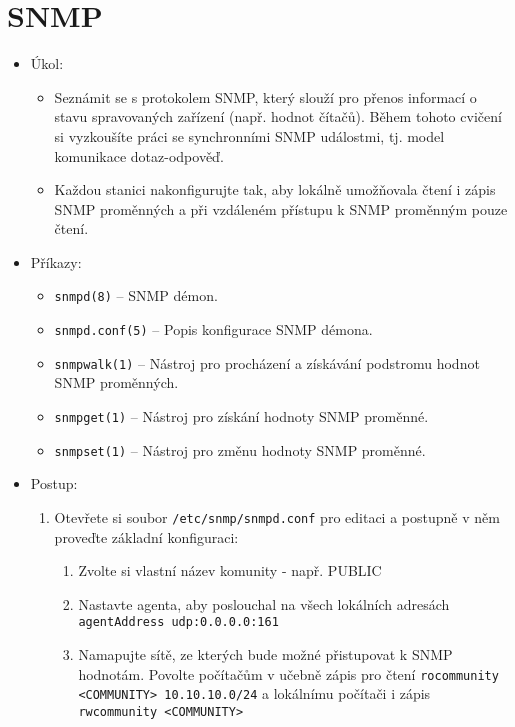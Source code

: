 \section{SNMP}
  \begin{itemize}
    \item Úkol: 
    \begin{itemize}
      \item Seznámit se s  protokolem SNMP, který slouží pro přenos
      informací o stavu spravovaných zařízení (např. hodnot čítačů). Během tohoto cvičení si
      vyzkoušíte práci se synchronními SNMP událostmi, tj. model komunikace dotaz-odpověď.
      \item Každou stanici nakonfigurujte tak, aby lokálně umožňovala čtení i zápis SNMP
      proměnných a při vzdáleném přístupu k SNMP proměnným pouze čtení.
    \end{itemize}
    \item Příkazy:
       \begin{itemize}
            \item {\tt snmpd(8)} -- SNMP démon.
            \item {\tt snmpd.conf(5)} -- Popis konfigurace SNMP démona.
            \item {\tt snmpwalk(1)} -- Nástroj pro procházení a získávání podstromu hodnot SNMP
         proměnných.
            \item {\tt snmpget(1)} -- Nástroj pro získání hodnoty SNMP proměnné.
            \item {\tt snmpset(1)} -- Nástroj pro změnu hodnoty SNMP proměnné.
        \end{itemize}
    \item Postup:
       \begin{enumerate}        
            \item Otevřete si soubor {\tt /etc/snmp/snmpd.conf} pro editaci a postupně
         v něm proveďte základní konfiguraci:
           \begin{enumerate}
               \item Zvolte si vlastní název komunity - např. PUBLIC
           \item Nastavte agenta, aby poslouchal na všech lokálních adresách \texttt{agentAddress
           udp:0.0.0.0:161}
               \item Namapujte sítě, ze kterých bude možné přistupovat k SNMP
           hodnotám. Povolte počítačům v učebně zápis pro čtení {\tt rocommunity
           <COMMUNITY> 10.10.10.0/24} a lokálnímu počítači i zápis {\tt rwcommunity <COMMUNITY>
}
\end{enumerate}
\end{enumerate}
\end{itemize}
